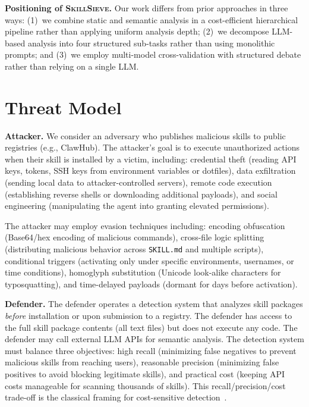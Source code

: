 \documentclass[sigconf,nonacm]{acmart}
\begin{document}
\textbf{Positioning of \textsc{SkillSieve}.} Our work differs from prior approaches in three ways: (1)~we combine static and semantic analysis in a cost-efficient hierarchical pipeline rather than applying uniform analysis depth; (2)~we decompose LLM-based analysis into four structured sub-tasks rather than using monolithic prompts; and (3)~we employ multi-model cross-validation with structured debate rather than relying on a single LLM.

\section{Threat Model}
\label{sec:threat}

\textbf{Attacker.} We consider an adversary who publishes malicious skills to public registries (e.g., ClawHub). The attacker's goal is to execute unauthorized actions when their skill is installed by a victim, including: credential theft (reading API keys, tokens, SSH keys from environment variables or dotfiles), data exfiltration (sending local data to attacker-controlled servers), remote code execution (establishing reverse shells or downloading additional payloads), and social engineering (manipulating the agent into granting elevated permissions).

The attacker may employ evasion techniques including: encoding obfuscation (Base64/hex encoding of malicious commands), cross-file logic splitting (distributing malicious behavior across \texttt{SKILL.md} and multiple scripts), conditional triggers (activating only under specific environments, usernames, or time conditions), homoglyph substitution (Unicode look-alike characters for typosquatting), and time-delayed payloads (dormant for days before activation).

\textbf{Defender.} The defender operates a detection system that analyzes skill packages \emph{before} installation or upon submission to a registry. The defender has access to the full skill package contents (all text files) but does not execute any code. The defender may call external LLM APIs for semantic analysis. The detection system must balance three objectives: high recall (minimizing false negatives to prevent malicious skills from reaching users), reasonable precision (minimizing false positives to avoid blocking legitimate skills), and practical cost (keeping API costs manageable for scanning thousands of skills). This recall/precision/cost trade-off is the classical framing for cost-sensitive detection~\cite{vanrijsbergen1979,elkan2001}.
\end{document}
